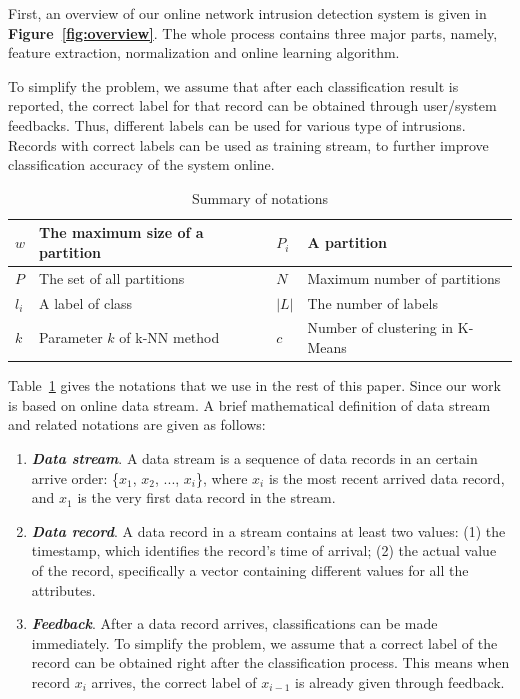 \documentclass[runningheads]{llncs}
\begin{document}
	First, an overview of our online network intrusion detection system is given in \textbf{Figure~\ref{fig:overview}}. The whole process contains three major parts, namely, feature extraction, normalization and online learning algorithm.
	
	To simplify the problem, we assume that after each classification result is reported, the correct label for that record can be obtained through user/system feedbacks. Thus, different labels can be used for various type of intrusions. Records with correct labels can be used as training stream, to further improve classification accuracy of the system online.
	
	\begin{table}
		\centering
		\caption{Summary of notations}\label{table:notation}
		\begin{tabular}{|m{1em}|m{16em}|m{1em}|m{16em}|}
			\hline
			$w$ & The maximum size of a partition & $P_i$ & A partition \\ 
			\hline
			$P$ & The set of all partitions & $N$ & Maximum number of partitions \\ 
			\hline
			$l_i$ & A label of class & $|L|$ & The number of labels  \\ 
			\hline
			$k$ & Parameter $k$ of k-NN method & $c$ & Number of clustering in K-Means \\
			\hline
		\end{tabular}
	\end{table}
	
	Table~\ref{table:notation} gives the notations that we use in the rest of this paper. Since our work is based on online data stream. A brief mathematical definition of data stream and related notations are given as follows:
	
	\begin{enumerate}
		\item \textbf{\textit{Data stream}}. A data stream is a sequence of data records in an certain arrive order: \big\{$x_1$, $x_2$, ..., $x_i$\big\}, where $x_i$ is the most recent arrived data record, and $x_1$ is the very first data record in the stream.
		\item \textbf{\textit{Data record}}. A data record in a stream contains at least two values: (1) the timestamp, which identifies the record's time of arrival; (2) the actual value of the record, specifically a vector containing different values for all the attributes.
		\item \textbf{\textit{Feedback}}. After a data record arrives, classifications can be made immediately. To simplify the problem, we assume that a correct label of the record can be obtained right after the classification process. This means when record $x_i$ arrives, the correct label of $x_{i-1}$ is already given through feedback.
	\end{enumerate}
	
\end{document}
